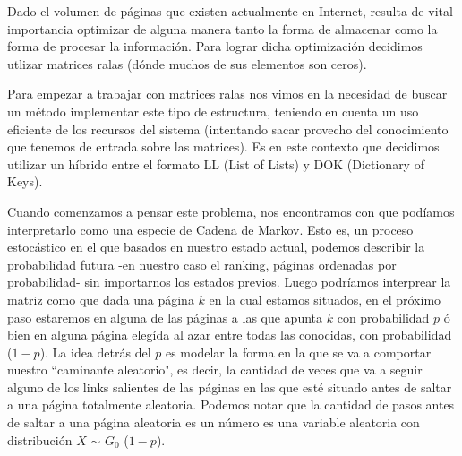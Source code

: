 \par Dado el volumen de p\'aginas que existen actualmente en Internet, resulta de vital importancia 
optimizar de alguna manera tanto la forma de almacenar
como la forma de procesar la informaci\'on. Para lograr dicha optimizaci\'on decidimos utlizar matrices ralas
 (d\'onde muchos de sus elementos son ceros).
\par Para empezar a trabajar con matrices ralas nos vimos en la necesidad de buscar un método implementar
 este tipo de estructura, teniendo en cuenta un uso eficiente de los recursos del sistema 
 (intentando sacar provecho del conocimiento que tenemos de entrada sobre las matrices). 
Es en este contexto que decidimos utilizar un h\'ibrido entre el formato LL (List of Lists) y 
DOK (Dictionary of Keys).


Cuando comenzamos a pensar este problema, nos encontramos con que pod\'iamos interpretarlo como una especie de Cadena de Markov. Esto es, un proceso estoc\'astico en el que basados en nuestro estado actual, podemos describir la probabilidad futura -en nuestro caso el ranking, p\'aginas ordenadas por probabilidad- sin importarnos los estados previos.
Luego podr\'iamos interprear la matriz \label{eq:desarrollada} como que dada una p\'agina $k$ en la cual estamos situados, en el pr\'oximo paso estaremos en alguna de las p\'aginas a las que apunta $k$ con probabilidad $p$ \'o bien en alguna p\'agina eleg\'ida al azar entre todas las conocidas, con probabilidad ($1-p$).
La idea detr\'as del $p$ es modelar la forma en la que se va a comportar nuestro ``caminante aleatorio", es decir, la cantidad de veces que va a seguir alguno de los links salientes de las p\'aginas en las que est\'e situado antes de saltar a una p\'agina totalmente aleatoria.
Podemos notar que la cantidad de pasos antes de saltar a una p\'agina aleatoria es un n\'umero es una variable aleatoria con distribuci\'on         $X$ $\sim$ $G_0$ ($1-p$).\newline